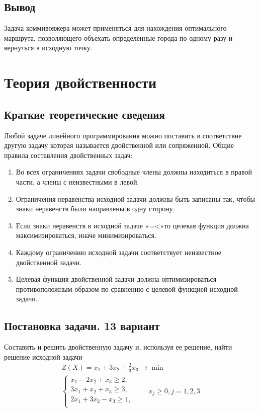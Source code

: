 \documentclass[a4paper, 12pt]{article}
\begin{document}
\subsection{Вывод}
Задача коммивояжера может применяться для нахождения оптимального маршрута, позволяющего объехать определенные города по одному разу и вернуться в исходную точку.

\newpage
\section{Теория двойственности}
\subsection{Краткие теоретические сведения}
Любой задаче линейного программирования можно поставить в соответствие другую задачу которая называется двойственной или сопряженной. Общие правила составления двойственных задач: 
\begin{enumerate}
  \item Во всех ограничениях задачи свободные члены должны находиться в правой части, а члены с неизвестными в левой. 
  \item Ограничения-неравенства исходной задачи должны быть записаны так, чтобы знаки неравенств были направлены в одну сторону. 
  \item Если знаки неравенств в исходной задаче «=<»то целевая функция должна максимизироваться, иначе минимизироваться.
  \item Каждому ограничению исходной задачи соответствует неизвестное двойственной задачи. 
  \item Целевая функция двойственной задачи должна оптимизироваться противоположным образом по сравнению с целевой функцией исходной задачи. 
\end{enumerate}
\subsection{Постановка задачи. 13 вариант}
Составить и решить двойственную задачу и, используя ее решение, найти решение исходной задачи
\begin{align*}
  Z(X)=x_1+3x_2+\frac{2}{3}x_3 \rightarrow \min\\
  \begin{cases}
    x_1-2x_2+x_3 \geq 2,\\
    3x_1+x_2+x_3 \geq 3,\\
    2x_1+3x_2-x_3\geq 1,\\
  \end{cases}
  \qquad x_j \geq 0, j=1,2,3
\end{align*}
\end{document}
